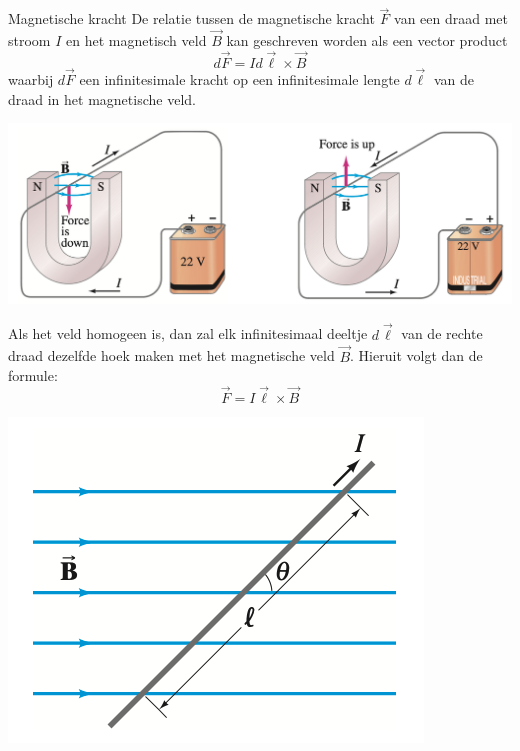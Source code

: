 \begin{theo}{Magnetische kracht}
    De relatie tussen de magnetische kracht $\Vec{F}$ van een draad met stroom $I$ en het magnetisch veld $\Vec{B}$ kan geschreven worden als een vector product
    \begin{equation*}
        d\Vec{F}= Id\Vec{\ell} \times \Vec{B}
    \end{equation*}
    waarbij $d\Vec{F}$ een infinitesimale kracht op een infinitesimale lengte $d\Vec{\ell}$ van de draad in het magnetische veld.
    \begin{center}
        \includegraphics[scale = 0.45]{Images/Magnetisme/MagnetischeKracht}
    \end{center}
    \begin{minipage}{.75\textwidth}
        Als het veld homogeen is, dan zal elk infinitesimaal deeltje $d\Vec{\ell}$ van de rechte draad dezelfde hoek maken met het magnetische veld $\Vec{B}$.
        Hieruit volgt dan de formule:
        \begin{equation*}
            \Vec{F} = I\Vec{\ell} \times \Vec{B}
        \end{equation*}
    \end{minipage}
    \begin{minipage}{.21\textwidth}
        \includegraphics[scale = 0.25]{Images/Magnetisme/DraadHomogeenVeld}
    \end{minipage}
\end{theo}

